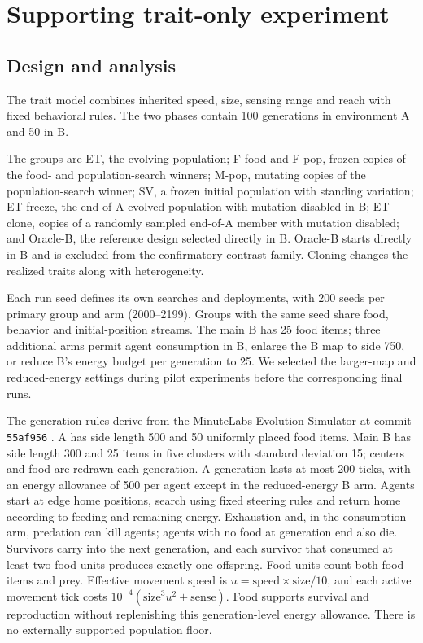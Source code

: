 \section{Supporting trait-only experiment}
\label{app:trait}
\subsection{Design and analysis}
The trait model combines inherited speed, size, sensing range and reach with fixed behavioral rules. The two phases contain 100 generations in environment A and 50 in B.

The groups are ET, the evolving population; F-food and F-pop, frozen copies of the food- and population-search winners; M-pop, mutating copies of the population-search winner; SV, a frozen initial population with standing variation; ET-freeze, the end-of-A evolved population with mutation disabled in B; ET-clone, copies of a randomly sampled end-of-A member with mutation disabled; and Oracle-B, the reference design selected directly in B. Oracle-B starts directly in B and is excluded from the confirmatory contrast family. Cloning changes the realized traits along with heterogeneity.

Each run seed defines its own searches and deployments, with 200 seeds per primary group and arm (2000--2199). Groups with the same seed share food, behavior and initial-position streams. The main B has 25 food items; three additional arms permit agent consumption in B, enlarge the B map to side 750, or reduce B's energy budget per generation to 25. We selected the larger-map and reduced-energy settings during pilot experiments before the corresponding final runs.

The generation rules derive from the MinuteLabs Evolution Simulator at commit \texttt{55af956} \citep{palfree_evolution_simulator}. A has side length 500 and 50 uniformly placed food items. Main B has side length 300 and 25 items in five clusters with standard deviation 15; centers and food are redrawn each generation. A generation lasts at most 200 ticks, with an energy allowance of 500 per agent except in the reduced-energy B arm. Agents start at edge home positions, search using fixed steering rules and return home according to feeding and remaining energy. Exhaustion and, in the consumption arm, predation can kill agents; agents with no food at generation end also die. Survivors carry into the next generation, and each survivor that consumed at least two food units produces exactly one offspring. Food units count both food items and prey. Effective movement speed is $u=\text{speed}\times\text{size}/10$, and each active movement tick costs $10^{-4}(\text{size}^3u^2+\text{sense})$. Food supports survival and reproduction without replenishing this generation-level energy allowance. There is no externally supported population floor.

